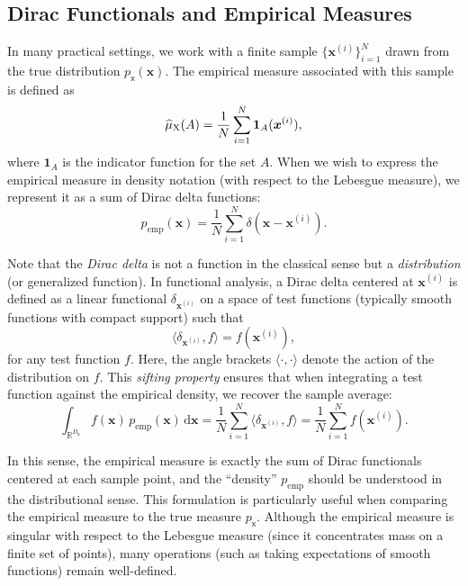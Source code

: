 \documentclass[runningheads]{llncs}
\newcommand{\vv}[1]{\boldsymbol{#1}}
\newcommand{\mm}[1]{\mathrm{#1}}
\newcommand{\rv}[1]{\mathsf{#1}}
\newcommand{\vrv}[1]{\vv{\rv{#1}}}
\begin{document}
\subsection*{Dirac Functionals and Empirical Measures}

In many practical settings, we work with a finite sample \(\{\vv{x}^{(i)}\}_{i=1}^N\) drawn from the true distribution \(p_{\vrv{x}}(\vv{x})\). The empirical measure associated with this sample is defined as
\begin{equation}
    \ELaw[\mm{X}](A) = \frac{1}{N} \sum_{i=1}^N \mathbf{1}_A(\vv{x}^{(i)}),
\end{equation}
where \(\mathbf{1}_A\) is the indicator function for the set \(A\). When we wish to express the empirical measure in density notation (with respect to the Lebesgue measure), we represent it as a sum of Dirac delta functions:
\begin{equation}
    p_{\text{emp}}(\vv{x}) = \frac{1}{N} \sum_{i=1}^N \delta(\vv{x}-\vv{x}^{(i)}).
\end{equation}

Note that the \emph{Dirac delta} is not a function in the classical sense but a \emph{distribution} (or generalized function). In functional analysis, a Dirac delta centered at \(\vv{x}^{(i)}\) is defined as a linear functional \(\delta_{\vv{x}^{(i)}}\) on a space of test functions (typically smooth functions with compact support) such that
\begin{equation}
    \langle \delta_{\vv{x}^{(i)}}, f \rangle = f(\vv{x}^{(i)}),
\end{equation}
for any test function \(f\). Here, the angle brackets \(\langle \cdot,\cdot \rangle\) denote the action of the distribution on \(f\). This \emph{sifting property} ensures that when integrating a test function against the empirical density, we recover the sample average:
\begin{equation}
    \int_{\mathbb{R}^{D_{\vrv{x}}}} f(\vv{x})\,p_{\text{emp}}(\vv{x})\,\mathrm{d}\vv{x}
    = \frac{1}{N} \sum_{i=1}^N \langle \delta_{\vv{x}^{(i)}}, f \rangle
    = \frac{1}{N} \sum_{i=1}^N f(\vv{x}^{(i)}).
\end{equation}

In this sense, the empirical measure is exactly the sum of Dirac functionals centered at each sample point, and the “density” \(p_{\text{emp}}\) should be understood in the distributional sense. This formulation is particularly useful when comparing the empirical measure to the true measure \(p_{\vrv{x}}\). Although the empirical measure is singular with respect to the Lebesgue measure (since it concentrates mass on a finite set of points), many operations (such as taking expectations of smooth functions) remain well-defined.
\end{document}
